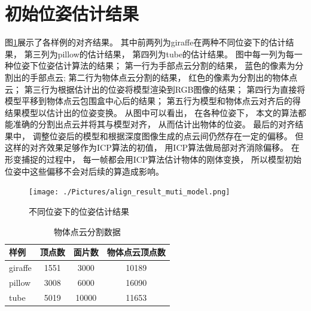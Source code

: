  \section{初始位姿估计结果}\label{sec_pose_est_res} 
 图\ref{align_result}展示了各样例的对齐结果。
 其中前两列为giraffe在两种不同位姿下的估计结果，
 第三列为pillow的估计结果，
 第四列为tube的估计结果。
 图中每一列为每一种位姿下位姿估计算法的结果；
 第一行为手部点云分割的结果，
 蓝色的像素为分割出的手部点云;
 第二行为物体点云分割的结果，
 红色的像素为分割出的物体点云；
 第三行为根据估计出的位姿将模型渲染到RGB图像的结果；
 第四行为直接将模型平移到物体点云包围盒中心后的结果；
 第五行为模型和物体点云对齐后的得结果模型以估计出的位姿变换。
 从图中可以看出，
 在各种位姿下，
 本文的算法都能准确的分割出点云并将其与模型对齐，
 从而估计出物体的位姿。
 最后的对齐结果中，
 调整位姿后的模型和根据深度图像生成的点云间仍然存在一定的偏移。
 但这样的对齐效果足够作为ICP算法的初值，
 用ICP算法做局部对齐消除偏移。
 在形变捕捉的过程中，
 每一帧都会用ICP算法估计物体的刚体变换，
 所以模型初始位姿中这些偏移不会对后续的算造成影响。
 \begin{figure}
    \centering
    \texttt{[image: ./Pictures/align\_result\_muti\_model.png]}
    \caption{不同位姿下的位姿估计结果}
    \label{align_result}
\end{figure}
\begin{table}
    \caption{物体点云分割数据}
    \label{tab_sample_data} 
    \centering
    \begin{tabular}[t]{|l|c|c|c|}
        \hline
        样例       &   顶点数   &   面片数   &  物体点云顶点数\\
        \hline
        giraffe     &   1551    &   3000    &   10189       \\
        \hline
        pillow      &   3008    &   6000    &   16090       \\
        \hline
        tube        &   5019    &   10000   &   11653       \\
        \hline
    \end{tabular}
\end{table}

